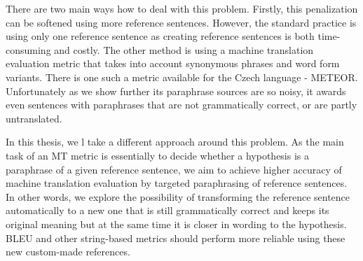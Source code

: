 There are two main ways how to deal with this problem. 
Firstly, this penalization can be softened using more reference sentences.
However, the standard practice is using only one reference sentence as creating reference sentences is both time-consuming and costly.
The other method is using a machine translation evaluation metric that takes into account synonymous phrases and word form variants. 
There is one such a metric available for the Czech language - METEOR. \cite{meteor} 
Unfortunately as we show further its paraphrase sources are so noisy, it awards even sentences with paraphrases that are not grammatically correct, or are partly untranslated.

In this thesis, we l take a different approach around this problem. 
As the main task of an MT metric is essentially to decide whether a hypothesis is a paraphrase of a given reference sentence, we aim to achieve higher accuracy of machine translation evaluation by targeted paraphrasing of reference sentences. In other words, we explore the possibility of transforming the reference sentence automatically to a new one that is still grammatically correct and keeps its original meaning but at the same time it is closer in wording to the hypothesis.
BLEU and other string-based metrics should perform more reliable using these new custom-made references.

